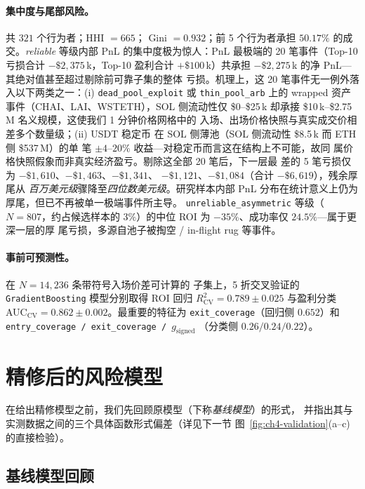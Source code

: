 \documentclass[11pt,a4paper]{ctexart}
\newcommand{\gsigned}{g_{\text{signed}}}
\begin{document}
\paragraph{集中度与尾部风险。} 共 $321$ 个行为者；HHI $=665$；
Gini $=0.932$；前 5 个行为者承担 $50.17\%$ 的成交。\emph{reliable}
等级内部 PnL 的集中度极为惊人：PnL 最极端的 20 笔事件（Top-10
亏损合计 $-\$2{,}375$\,k，Top-10 盈利合计 $+\$100$\,k）共承担
$-\$2{,}275$\,k 的净 PnL---其绝对值甚至超过剔除前可靠子集的整体
亏损。机理上，这 20 笔事件无一例外落入以下两类之一：(i)
\texttt{dead\_pool\_exploit} 或 \texttt{thin\_pool\_arb} 上的
wrapped 资产事件（CHAI、LAI、WSTETH），SOL 侧流动性仅 \$0--\$25\,k
却承接 \$10\,k--\$2.75\,M 名义规模，这使我们 1 分钟价格网格中的
入场、出场价格快照与真实成交价相差多个数量级；(ii) USDT 稳定币
在 SOL 侧薄池（SOL 侧流动性 \$8.5\,k 而 ETH 侧 \$537\,M）的单
笔 $\pm\!4$--$20\%$ 收益---对稳定币而言这在结构上不可能，故同
属价格快照假象而非真实经济盈亏。剔除这全部 20 笔后，下一层最
差的 5 笔亏损仅为 $-\$1{,}610$、$-\$1{,}463$、$-\$1{,}341$、
$-\$1{,}121$、$-\$1{,}084$（合计 $-\$6{,}619$），残余厚尾从
\emph{百万美元级}骤降至\emph{四位数美元级}。研究样本内部 PnL
分布在统计意义上仍为厚尾，但已不再被单一极端事件所主导。
\texttt{unreliable\_asymmetric} 等级（$N=807$，约占候选样本的
$3\%$）的中位 ROI 为 $-35\%$、成功率仅 $24.5\%$---属于更深一层的厚
尾亏损，多源自池子被掏空 / in-flight rug 等事件。

\paragraph{事前可预测性。} 在 $N=14{,}236$ 条带符号入场价差可计算的
子集上，5 折交叉验证的 \texttt{GradientBoosting} 模型分别取得
ROI 回归 $R^{2}_{\text{CV}} = 0.789 \pm 0.025$ 与盈利分类
AUC$_{\text{CV}} = 0.862 \pm 0.002$。最重要的特征为
\texttt{exit\_coverage}（回归侧 $0.652$）和
\texttt{entry\_coverage / exit\_coverage / $\gsigned$}
（分类侧 $0.26 / 0.24 / 0.22$）。

\section{精修后的风险模型}
\label{sec:ch4-refined-model}

在给出精修模型之前，我们先回顾原模型（下称\textit{基线模型}）的形式，
并指出其与实测数据之间的三个具体函数形式偏差（详见下一节
图~\ref{fig:ch4-validation}(a--c) 的直接检验）。

\subsection{基线模型回顾}
\end{document}
